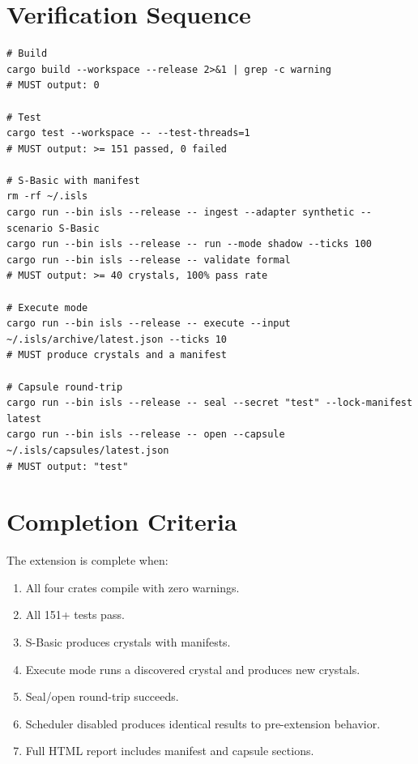 \documentclass[11pt,a4paper,twoside]{article}
\theoremstyle{definition}
\theoremstyle{plain}
\theoremstyle{remark}
\begin{document}
\section{Verification Sequence}\label{sec:handoff:verify}

\begin{verbatim}
# Build
cargo build --workspace --release 2>&1 | grep -c warning
# MUST output: 0

# Test
cargo test --workspace -- --test-threads=1
# MUST output: >= 151 passed, 0 failed

# S-Basic with manifest
rm -rf ~/.isls
cargo run --bin isls --release -- ingest --adapter synthetic --scenario S-Basic
cargo run --bin isls --release -- run --mode shadow --ticks 100
cargo run --bin isls --release -- validate formal
# MUST output: >= 40 crystals, 100% pass rate

# Execute mode
cargo run --bin isls --release -- execute --input ~/.isls/archive/latest.json --ticks 10
# MUST produce crystals and a manifest

# Capsule round-trip
cargo run --bin isls --release -- seal --secret "test" --lock-manifest latest
cargo run --bin isls --release -- open --capsule ~/.isls/capsules/latest.json
# MUST output: "test"
\end{verbatim}

\section{Completion Criteria}\label{sec:handoff:done}

The extension is complete when:
\begin{enumerate}[nosep]
  \item All four crates compile with zero warnings.
  \item All 151+ tests pass.
  \item S-Basic produces crystals with manifests.
  \item Execute mode runs a discovered crystal and produces new crystals.
  \item Seal/open round-trip succeeds.
  \item Scheduler disabled produces identical results to pre-extension
        behavior.
  \item Full HTML report includes manifest and capsule sections.
\end{enumerate}


\appendix
\end{document}
